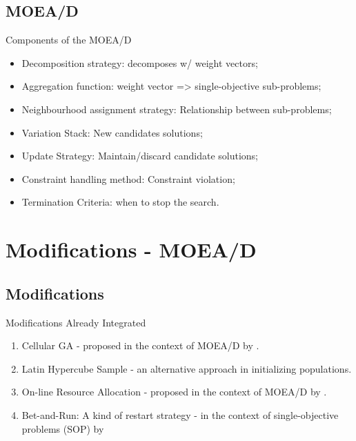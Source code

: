 \documentclass[ignorenonframetext,]{beamer}
\providecommand{\tightlist}{%
  \setlength{\itemsep}{0pt}\setlength{\parskip}{0pt}}
\begin{document}
\subsection{MOEA/D}\label{moead-3}

\begin{frame}{Components of the MOEA/D}

\begin{itemize}
\tightlist
\item
  Decomposition strategy: decomposes w/ weight vectors;
\item
  Aggregation function: weight vector =\textgreater{} single-objective
  sub-problems;
\item
  Neighbourhood assignment strategy: Relationship between sub-problems;
\item
  Variation Stack: New candidates solutions;
\item
  Update Strategy: Maintain/discard candidate solutions;
\item
  Constraint handling method: Constraint violation;
\item
  Termination Criteria: when to stop the search.
\end{itemize}

\end{frame}

\section{Modifications - MOEA/D}\label{modifications---moead}

\subsection{Modifications}\label{modifications}

\begin{frame}{Modifications Already Integrated}

\begin{enumerate}
\def\labelenumi{\arabic{enumi}.}
\tightlist
\item
  Cellular GA - proposed in the context of MOEA/D by
  \citet{ishibuchi2009adaptation}.
\item
  Latin Hypercube Sample - an alternative approach in initializing
  populations.
\item
  On-line Resource Allocation - proposed in the context of MOEA/D by
  \citet{zhou2016all}.
\item
  Bet-and-Run: A kind of restart strategy - in the context of
  single-objective problems (SOP) by \citet{friedrich2017generic}
\end{enumerate}

\end{frame}
\end{document}
